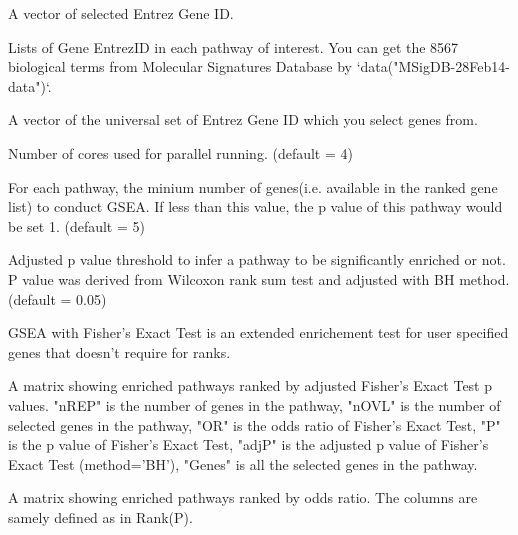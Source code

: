\documentclass[letterpaper]{book}
\begin{document}
%
\begin{Arguments}
\begin{ldescription}
\item[\code{selEID.v}] A vector of selected Entrez Gene ID.

\item[\code{ptw.ls}] Lists of Gene EntrezID in each pathway of interest. You can get the 8567 biological terms from Molecular Signatures Database by `data("MSigDB-28Feb14-data")`.

\item[\code{allEID.v}] A vector of the universal set of Entrez Gene ID which you select genes from.

\item[\code{ncores}] Number of cores used for parallel running. (default = 4)

\item[\code{minN}] For each pathway, the minium number of genes(i.e. available in the ranked gene list) to conduct GSEA. If less than this value, the p value of this pathway would be set 1. (default = 5)

\item[\code{adjPVth}] Adjusted p value threshold to infer a pathway to be significantly enriched or not. P value was derived from Wilcoxon rank sum test and adjusted with BH method. (default = 0.05)
\end{ldescription}
\end{Arguments}
%
\begin{Details}\relax
GSEA with Fisher's Exact Test is an extended enrichement test for user specified genes that doesn't require for ranks.
\end{Details}
%
\begin{Value}
\begin{ldescription}
\item[\code{Rank(P)}] A matrix showing enriched pathways ranked by adjusted Fisher's Exact Test p values.
"nREP" is the number of genes in the pathway,
"nOVL" is the number of selected genes in the pathway,
"OR" is the odds ratio of Fisher's Exact Test,
"P" is the p value of Fisher's Exact Test,
"adjP" is the adjusted p value of Fisher's Exact Test (method='BH'),
"Genes" is all the selected genes in the pathway.

\item[\code{Rank(OR)}] A matrix showing enriched pathways ranked by odds ratio. The columns are samely defined as in Rank(P).
\end{ldescription}
\end{Value}
\end{document}
